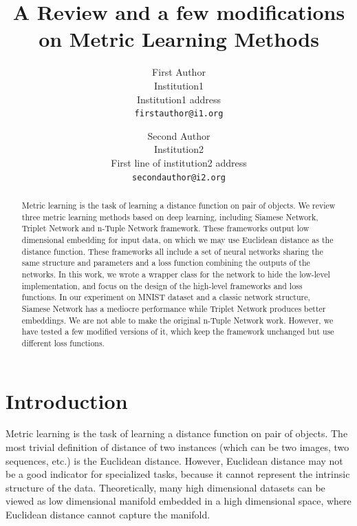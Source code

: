 \documentclass[10pt,twocolumn,letterpaper]{article}
\begin{document}
	
	\title{A Review and a few modifications on Metric Learning Methods}
	
	\author{First Author\\
		Institution1\\
		Institution1 address\\
		{\tt\small firstauthor@i1.org}
		\and
		Second Author\\
		Institution2\\
		First line of institution2 address\\
		{\tt\small secondauthor@i2.org}
	}
	
	\maketitle
	
	\begin{abstract}
		Metric learning is the task of learning a distance function on pair of objects. We review three metric learning methods based on deep learning, including Siamese Network, Triplet Network and n-Tuple Network framework. These frameworks output low dimensional embedding for input data, on which we may use Euclidean distance as the distance function. These frameworks all include a set of neural networks sharing the same structure and parameters and a loss function combining the outputs of the networks. In this work, we wrote a wrapper class for the network to hide the low-level implementation, and focus on the design of the high-level frameworks and loss functions. In our experiment on MNIST dataset and a classic network structure, Siamese Network has a mediocre performance while Triplet Network produces better embeddings. We are not able to make the original n-Tuple Network work. However, we have tested a few modified versions of it, which keep the framework unchanged but use different loss functions.
	\end{abstract}
	
	\section{Introduction}
	Metric learning is the task of learning a distance function on pair of objects. The most trivial definition of distance of two instances (which can be two images, two sequences, etc.) is the Euclidean distance. However, Euclidean distance may not be a good indicator for specialized tasks, because it cannot represent the intrinsic structure of the data. Theoretically, many high dimensional datasets can be viewed as low dimensional manifold embedded in a high dimensional space, where Euclidean distance cannot capture the manifold.
	
\end{document}
